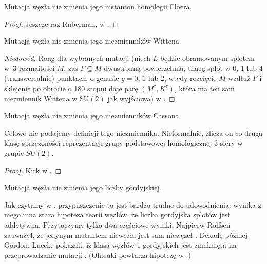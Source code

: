 \begin{proposition}
%
    Mutacja węzła nie zmienia jego instanton homologii Floera.
\end{proposition}

\begin{proof}
%
    Jeszcze raz Ruberman, w \cite{ruberman99}.
\end{proof}

\begin{proposition}
%
    Mutacja węzła nie zmienia jego niezmienników Wittena.
\end{proposition}

\begin{proof}[Niedowód]
    Rong dla wybranych mutacji (niech $L$ będzie obramowanym splotem w~3-rozmaitości $M$, zaś $F \subseteq M$ dwustronną powierzchnią, tnącą splot w 0, 1 lub 4 (transwersalnie) punktach, o genusie $g = 0$, $1$ lub $2$, wtedy rozcięcie $M$ wzdłuż $F$ i sklejenie po obrocie o 180 stopni daje parę $(M^\tau, K^\tau)$, która ma ten sam niezmiennik Wittena w $\mathrm{SU}(2)$ jak wyjściowa) w \cite{rong94}.
\end{proof}

\begin{proposition}
%
    Mutacja węzła nie zmienia jego niezmienników Cassona.
\end{proposition}

Celowo nie podajemy definicji tego niezmiennika.
Nieformalnie, zlicza on co drugą klasę sprzężoności reprezentacji grupy podstawowej homologicznej 3-sfery w grupie $SU(2)$.

\begin{proof}
    Kirk w \cite{kirk89}.
\end{proof}

\begin{conjecture}
    Mutacja węzła nie zmienia jego liczby gordyjskiej.
\end{conjecture}

Jak czytamy w \cite[problem 1.69]{kirby78}, przypuszczenie to jest bardzo trudne do udowodnienia: wynika z niego inna stara hipoteza teorii węzłów, że liczba gordyjska splotów jest addytywna.
%
Przytoczymy tylko dwa częściowe wyniki.
Najpierw Rolfsen zauważył, że jedynym mutantem niewęzła jest sam niewęzeł \cite{rolfsen93}.
%
Dekadę później Gordon, Luecke pokazali, iż klasa węzłów $1$-gordyjskich jest zamknięta na przeprowadzanie mutacji \cite{gordon06}.
%
%
(Ohtsuki powtarza hipotezę w \cite[problem 12.15]{ohtsuki02}.)
%

